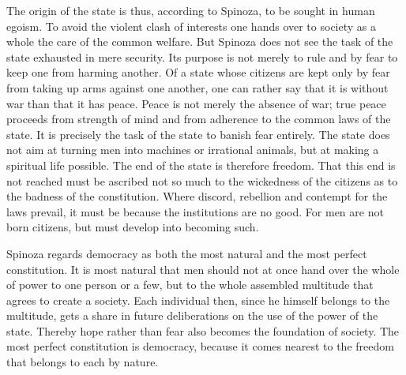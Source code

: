 \documentclass[12pt]{book}
\newcommand{\opage}[1]{\marginnote{\footnotesize\textit{[#1]}}}
\begin{document}
The origin of the state is thus, according to Spinoza, to be sought in human egoism. To
avoid the violent clash of interests one hands over to society as a whole the care of the
common welfare. But Spinoza does not see the task of the state exhausted in mere security.
Its purpose is not merely to rule and by fear to keep one from harming another. Of a state
whose citizens are kept only by fear from taking up arms against one another, one can
rather say that it is without war than that it has peace. Peace is not merely the absence
of war; true peace proceeds from strength of mind and from adherence to the common laws
of the state. It is precisely the task of the state to banish fear entirely. The state
does not aim at turning men into machines or irrational animals, but at making a
spiritual life possible. The end of the state is \opage{152}therefore freedom. That this
end is not reached must be ascribed not so much to the wickedness of the citizens as to
the badness of the constitution. Where discord, rebellion and contempt for the laws
prevail, it must be because the institutions are no good. For men are not born citizens,
but must develop into becoming such.

Spinoza regards democracy as both the most natural and the most perfect constitution.
It is most natural that men should not at once hand over the whole of power to one person
or a few, but to the whole assembled multitude that agrees to create a society. Each
individual then, since he himself belongs to the multitude, gets a share in future
deliberations on the use of the power of the state. Thereby hope rather than fear also
becomes the foundation of society. The most perfect constitution is democracy, because it
comes nearest to the freedom that belongs to each by nature.
\end{document}
